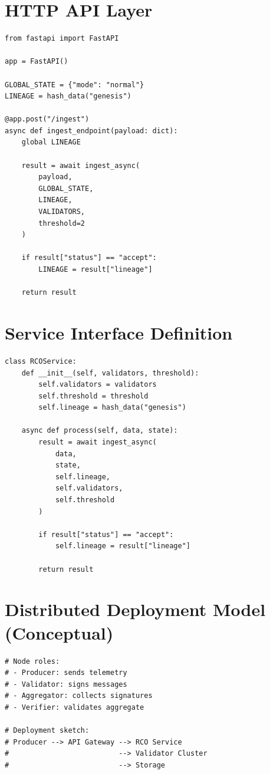 \section{HTTP API Layer}

\begin{verbatim}
from fastapi import FastAPI

app = FastAPI()

GLOBAL_STATE = {"mode": "normal"}
LINEAGE = hash_data("genesis")

@app.post("/ingest")
async def ingest_endpoint(payload: dict):
    global LINEAGE

    result = await ingest_async(
        payload,
        GLOBAL_STATE,
        LINEAGE,
        VALIDATORS,
        threshold=2
    )

    if result["status"] == "accept":
        LINEAGE = result["lineage"]

    return result
\end{verbatim}

\section{Service Interface Definition}

\begin{verbatim}
class RCOService:
    def __init__(self, validators, threshold):
        self.validators = validators
        self.threshold = threshold
        self.lineage = hash_data("genesis")

    async def process(self, data, state):
        result = await ingest_async(
            data,
            state,
            self.lineage,
            self.validators,
            self.threshold
        )

        if result["status"] == "accept":
            self.lineage = result["lineage"]

        return result
\end{verbatim}

\section{Distributed Deployment Model (Conceptual)}

\begin{verbatim}
# Node roles:
# - Producer: sends telemetry
# - Validator: signs messages
# - Aggregator: collects signatures
# - Verifier: validates aggregate

# Deployment sketch:
# Producer --> API Gateway --> RCO Service
#                          --> Validator Cluster
#                          --> Storage
\end{verbatim}

